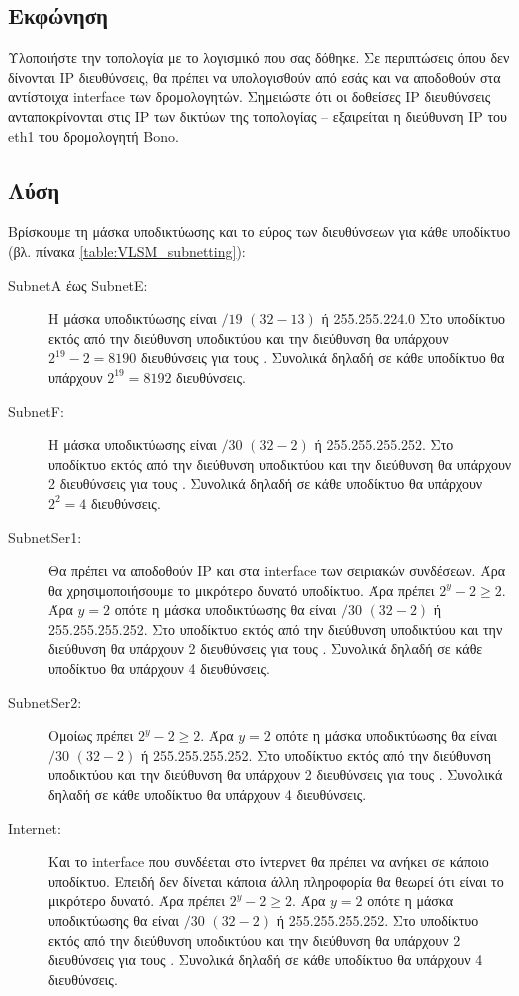 \documentclass{assignment}
\begin{document}
\subsection{Εκφώνηση}

Υλοποιήστε την τοπολογία με το λογισμικό που σας δόθηκε. Σε περιπτώσεις όπου δεν δίνονται IP διευθύνσεις, θα πρέπει να υπολογισθούν από εσάς και να αποδοθούν στα αντίστοιχα interface των δρομολογητών. Σημειώστε ότι οι δοθείσες IP διευθύνσεις ανταποκρίνονται στις IP των δικτύων της τοπολογίας – εξαιρείται η διεύθυνση IP του eth1 του δρομολογητή Bono. 

\subsection{Λύση}


Βρίσκουμε τη μάσκα υποδικτύωσης και το εύρος των διευθύνσεων για κάθε υποδίκτυο (βλ. πίνακα \ref{table:VLSM_subnetting}):

\begin{description}
\item[SubnetA έως SubnetE:] H μάσκα υποδικτύωσης είναι $/19$ $(32-13)$ ή 255.255.224.0 Στο υποδίκτυο εκτός από την διεύθυνση υποδικτύου και την  διεύθυνση θα υπάρχουν $2^{19} - 2 = 8190$ διευθύνσεις για τους . Συνολικά δηλαδή σε κάθε υποδίκτυο θα υπάρχουν $2^{19} = 8192$ διευθύνσεις.

\item[SubnetF:] H μάσκα υποδικτύωσης είναι $/30$ $(32-2)$ ή 255.255.255.252. Στο υποδίκτυο εκτός από την διεύθυνση υποδικτύου και την  διεύθυνση θα υπάρχουν 2 διευθύνσεις για τους . Συνολικά δηλαδή σε κάθε υποδίκτυο θα υπάρχουν $2^2 = 4$ διευθύνσεις.

\item[SubnetSer1:] Θα πρέπει να αποδοθούν IP και στα interface των σειριακών συνδέσεων. Άρα θα χρησιμοποιήσουμε το μικρότερο δυνατό υποδίκτυο. Άρα πρέπει $2^y -2 \geq 2$. Άρα $y=2$ οπότε η μάσκα υποδικτύωσης θα είναι $/30$ $(32-2)$ ή 255.255.255.252. Στο υποδίκτυο εκτός από την διεύθυνση υποδικτύου και την  διεύθυνση θα υπάρχουν 2 διευθύνσεις για τους . Συνολικά δηλαδή σε κάθε υποδίκτυο θα υπάρχουν 4 διευθύνσεις.

\item[SubnetSer2:] Ομοίως πρέπει $2^y -2 \geq 2$. Άρα $y=2$ οπότε η μάσκα υποδικτύωσης θα είναι $/30$ $(32-2)$ ή 255.255.255.252. Στο υποδίκτυο εκτός από την διεύθυνση υποδικτύου και την  διεύθυνση θα υπάρχουν 2 διευθύνσεις για τους . Συνολικά δηλαδή σε κάθε υποδίκτυο θα υπάρχουν 4 διευθύνσεις.

\item[Internet:] Και το interface που συνδέεται στο ίντερνετ θα πρέπει να ανήκει σε κάποιο υποδίκτυο. Επειδή δεν δίνεται κάποια άλλη πληροφορία θα θεωρεί ότι είναι το μικρότερο δυνατό. Άρα πρέπει $2^y -2 \geq 2$. Άρα $y=2$ οπότε η μάσκα υποδικτύωσης θα είναι $/30$ $(32-2)$ ή 255.255.255.252. Στο υποδίκτυο εκτός από την διεύθυνση υποδικτύου και την  διεύθυνση θα υπάρχουν 2 διευθύνσεις για τους . Συνολικά δηλαδή σε κάθε υποδίκτυο θα υπάρχουν 4 διευθύνσεις.


\end{description}
\end{document}
